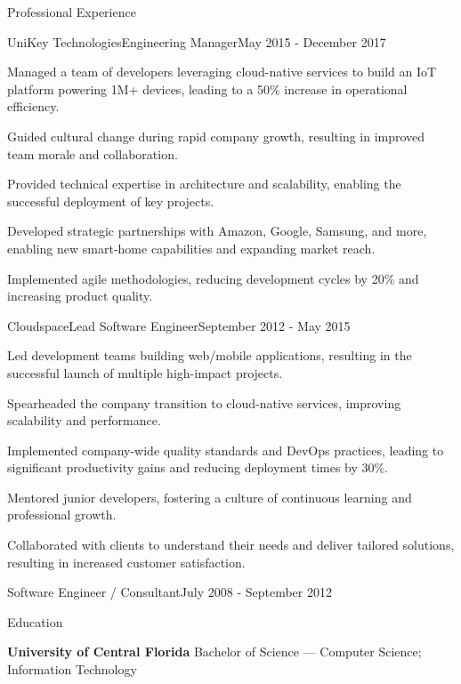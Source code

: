 \documentclass{resume} %
\begin{document}
\begin{rSection}{Professional Experience}
  \begin{rNewRole}{UniKey Technologies}{Engineering Manager}{May 2015 - December 2017}
    \item Managed a team of developers leveraging cloud-native services to build an IoT platform powering 1M+ devices, leading to a 50\% increase in operational efficiency.
    \item Guided cultural change during rapid company growth, resulting in improved team morale and collaboration.
    \item Provided technical expertise in architecture and scalability, enabling the successful deployment of key projects.
    \item Developed strategic partnerships with Amazon, Google, Samsung, and more, enabling new smart-home capabilities and expanding market reach.
    \item Implemented agile methodologies, reducing development cycles by 20\% and increasing product quality.
  \end{rNewRole}

  \begin{rNewRole}{Cloudspace}{Lead Software Engineer}{September 2012 - May 2015}
    \item Led development teams building web/mobile applications, resulting in the successful launch of multiple high-impact projects.
    \item Spearheaded the company transition to cloud-native services, improving scalability and performance.
    \item Implemented company-wide quality standards and DevOps practices, leading to significant productivity gains and reducing deployment times by 30\%.
    \item Mentored junior developers, fostering a culture of continuous learning and professional growth.
    \item Collaborated with clients to understand their needs and deliver tailored solutions, resulting in increased customer satisfaction.
  \end{rNewRole}
  
  
  \begin{rCompany}{Software Engineer / Consultant}{July 2008 - September 2012}{}

  \end{rCompany}
  
  
  
\end{rSection}

\vspace{0.5em} %
\begin{rSection}{Education}
  
  {\bf University of Central Florida } Bachelor of Science --- Computer Science; Information Technology
  
\end{rSection}
\end{document}
